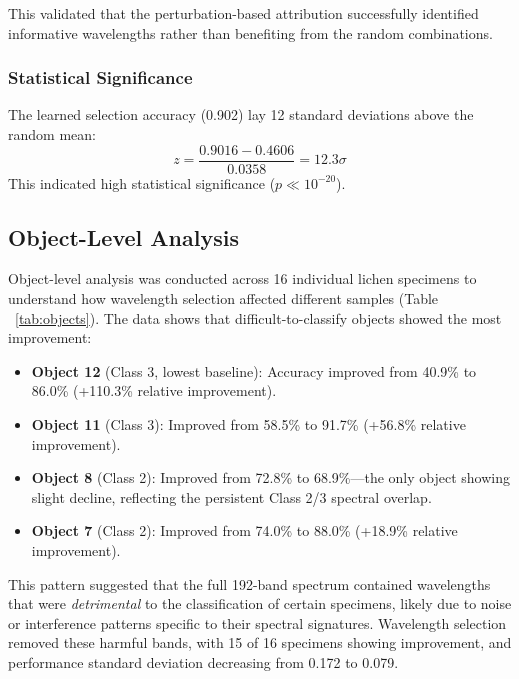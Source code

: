 This validated that the perturbation-based attribution successfully identified informative wavelengths rather than benefiting from the random combinations.

\subsubsection{Statistical Significance}
The learned selection accuracy (0.902) lay 12 standard deviations above the random mean:
\begin{equation}
z = \frac{0.9016 - 0.4606}{0.0358} = 12.3\sigma
\end{equation}
This indicated high statistical significance ($p \ll 10^{-20}$).
\subsection{Object-Level Analysis}
\label{sec:results_objects}

Object-level analysis was conducted across 16 individual lichen specimens to understand how wavelength selection affected different samples (Table ~\ref{tab:objects}). 
The data shows that difficult-to-classify objects showed the most improvement:
\begin{itemize}
    \item \textbf{Object 12} (Class 3, lowest baseline): Accuracy improved from 40.9\% to 86.0\% (+110.3\% relative improvement).
    \item \textbf{Object 11} (Class 3): Improved from 58.5\% to 91.7\% (+56.8\% relative improvement).
    \item \textbf{Object 8} (Class 2): Improved from 72.8\% to 68.9\%---the only object showing slight decline, reflecting the persistent Class 2/3 spectral overlap.
    \item \textbf{Object 7} (Class 2): Improved from 74.0\% to 88.0\% (+18.9\% relative improvement).
\end{itemize}

This pattern suggested that the full 192-band spectrum contained wavelengths that were \emph{detrimental} to the classification of certain specimens, likely due to noise or interference patterns specific to their spectral signatures.
Wavelength selection removed these harmful bands, with 15 of 16 specimens showing improvement, and performance standard deviation decreasing from 0.172 to 0.079.



